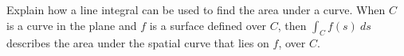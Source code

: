 {Explain how a line integral can be used to find the area under a curve.
}
{When $C$ is a curve in the plane and $f$ is a surface defined over $C$, then $\int_C f(s)\ ds$ describes the area under the spatial curve that lies on $f$, over $C$.
}
